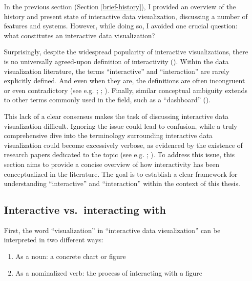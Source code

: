\documentclass[
]{book}
\providecommand{\tightlist}{%
  \setlength{\itemsep}{0pt}\setlength{\parskip}{0pt}}
\begin{document}
In the previous section (Section \ref{brief-history}), I provided an overview of the history and present state of interactive data visualization, discussing a number of features and systems. However, while doing so, I avoided one crucial question: what constitutes an interactive data visualization?

Surprisingly, despite the widespread popularity of interactive visualizations, there is no universally agreed-upon definition of interactivity (). Within the data visualization literature, the terms ``interactive'' and ``interaction'' are rarely explicitly defined. And even when they are, the definitions are often incongruent or even contradictory (see e.g. ; ; ). Finally, similar conceptual ambiguity extends to other terms commonly used in the field, such as a ``dashboard'' ().

This lack of a clear consensus makes the task of discussing interactive data visualization difficult. Ignoring the issue could lead to confusion, while a truly comprehensive dive into the terminology surrounding interactive data visualization could become excessively verbose, as evidenced by the existence of research papers dedicated to the topic (see e.g. ; ). To address this issue, this section aims to provide a concise overview of how interactivity has been conceptualized in the literature. The goal is to establish a clear framework for understanding ``interactive'' and ``interaction'' within the context of this thesis.

\subsection{Interactive vs.~interacting with}\label{interactive-interacting}

First, the word ``visualization'' in ``interactive data visualization'' can be interpreted in two different ways:

\begin{enumerate}
\def\labelenumi{\arabic{enumi}.}
\tightlist
\item
  As a noun: a concrete chart or figure
\item
  As a nominalized verb: the process of interacting with a figure
\end{enumerate}
\end{document}
